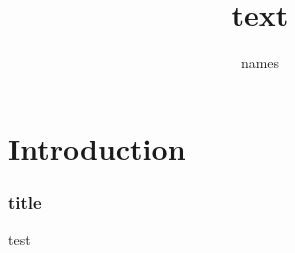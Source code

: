 \documentclass{beamer}
\author{names}
\title{text}
\begin{document}
\section{Introduction}

\begin{frame}
    \frametitle{title}
    test
\end{frame}
\end{document}

